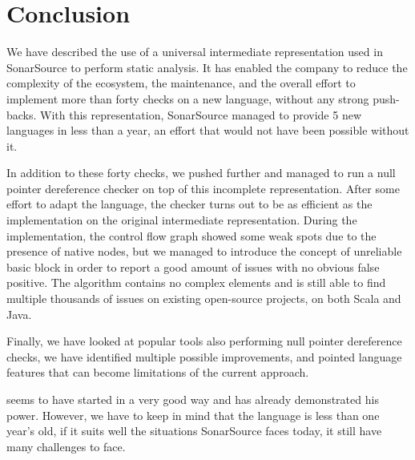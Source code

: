 \section{Conclusion}
\label{sec:conclusion}

We have described the use of a universal intermediate representation used in SonarSource to perform static analysis.
It has enabled the company to reduce the complexity of the ecosystem, the maintenance, and the overall effort to implement more than forty checks on a new language, without any strong push-backs.
With this representation, SonarSource managed to provide 5 new languages in less than a year, an effort that would not have been possible without it.

In addition to these forty checks, we pushed \slang{} further and managed to run a null pointer dereference checker on top of this incomplete representation. 
After some effort to adapt the language, the checker turns out to be as efficient as the implementation on the original intermediate representation.
During the implementation, the control flow graph showed some weak spots due to the presence of native nodes, but we managed to introduce the concept of unreliable basic block in order to report a good amount of issues with no obvious false positive.
The algorithm contains no complex elements and is still able to find multiple thousands of issues on existing open-source projects, on both Scala and Java.

Finally, we have looked at popular tools also performing null pointer dereference checks, we have identified multiple possible improvements, and pointed language features that can become limitations of the current approach.

\slang{} seems to have started in a very good way and has already demonstrated his power.
However, we have to keep in mind that the language is less than one year's old, if it suits well the situations SonarSource faces today, it still have many challenges to face.
